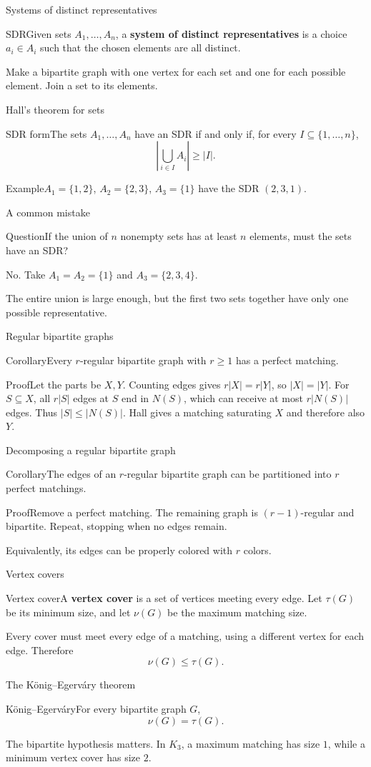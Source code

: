 \documentclass[aspectratio=169,11pt]{beamer}
\newcommand{\Def}[2]{\begin{block}{#1}#2\end{block}}
\newcommand{\Thm}[2]{\begin{block}{#1}#2\end{block}}
\renewcommand{\Proof}[1]{\begin{block}{Proof}\normalsize #1\end{block}}
\newcommand{\Question}[1]{\begin{block}{Question}#1\end{block}}
\renewcommand{\Example}[1]{\begin{block}{Example}#1\end{block}}
\newcommand{\gap}{\par\medskip}
\begin{document}
\begin{frame}{Systems of distinct representatives}
\large
\Def{SDR}{Given sets $A_1,\ldots,A_n$, a \textbf{system of distinct representatives} is a choice $a_i\in A_i$ such that the chosen elements are all distinct.}
\gap Make a bipartite graph with one vertex for each set and one for each possible element. Join a set to its elements.
\end{frame}
\begin{frame}{Hall's theorem for sets}
\large
\Thm{SDR form}{The sets $A_1,\ldots,A_n$ have an SDR if and only if, for every $I\subseteq\{1,\ldots,n\}$,
\[\left|\bigcup_{i\in I}A_i\right|\geq |I|.\]}
\Example{$A_1=\{1,2\}$, $A_2=\{2,3\}$, $A_3=\{1\}$ have the SDR $(2,3,1)$.}
\end{frame}
\begin{frame}{A common mistake}
\large
\Question{If the union of $n$ nonempty sets has at least $n$ elements, must the sets have an SDR?}
\gap No. Take $A_1=A_2=\{1\}$ and $A_3=\{2,3,4\}$.
\gap The entire union is large enough, but the first two sets together have only one possible representative.
\end{frame}
\begin{frame}{Regular bipartite graphs}
\large
\Thm{Corollary}{Every $r$-regular bipartite graph with $r\geq1$ has a perfect matching.}
\Proof{Let the parts be $X,Y$. Counting edges gives $r|X|=r|Y|$, so $|X|=|Y|$. For $S\subseteq X$, all $r|S|$ edges at $S$ end in $N(S)$, which can receive at most $r|N(S)|$ edges. Thus $|S|\leq|N(S)|$. Hall gives a matching saturating $X$ and therefore also $Y$.}
\end{frame}
\begin{frame}{Decomposing a regular bipartite graph}
\large
\Thm{Corollary}{The edges of an $r$-regular bipartite graph can be partitioned into $r$ perfect matchings.}
\Proof{Remove a perfect matching. The remaining graph is $(r-1)$-regular and bipartite. Repeat, stopping when no edges remain.}
\gap Equivalently, its edges can be properly colored with $r$ colors.
\end{frame}
\begin{frame}{Vertex covers}
\large
\Def{Vertex cover}{A \textbf{vertex cover} is a set of vertices meeting every edge. Let $\tau(G)$ be its minimum size, and let $\nu(G)$ be the maximum matching size.}
\gap Every cover must meet every edge of a matching, using a different vertex for each edge. Therefore
\[\nu(G)\leq\tau(G).\]
\end{frame}
\begin{frame}{The K\"onig--Egerv\'ary theorem}
\large
\Thm{K\"onig--Egerv\'ary}{For every bipartite graph $G$,
\[\nu(G)=\tau(G).\]}
\gap The bipartite hypothesis matters. In $K_3$, a maximum matching has size $1$, while a minimum vertex cover has size $2$.
\end{frame}
\end{document}
